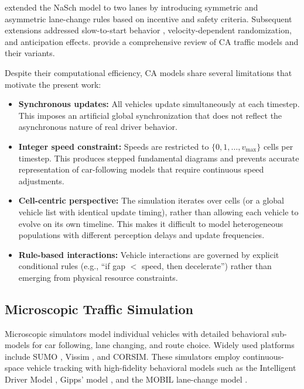 \documentclass[review,authoryear]{elsarticle}
\begin{document}
\citet{rickert1996two} extended the NaSch model to two lanes by introducing symmetric and asymmetric lane-change rules based on incentive and safety criteria. Subsequent extensions addressed slow-to-start behavior \citep{knospe2000towards}, velocity-dependent randomization, and anticipation effects. \citet{maerivoet2005cellular} provide a comprehensive review of CA traffic models and their variants.

Despite their computational efficiency, CA models share several limitations that motivate the present work:

\begin{itemize}
    \item \textbf{Synchronous updates:} All vehicles update simultaneously at each timestep. This imposes an artificial global synchronization that does not reflect the asynchronous nature of real driver behavior.

    \item \textbf{Integer speed constraint:} Speeds are restricted to $\{0, 1, \ldots, v_{\max}\}$ cells per timestep. This produces stepped fundamental diagrams and prevents accurate representation of car-following models that require continuous speed adjustments.

    \item \textbf{Cell-centric perspective:} The simulation iterates over cells (or a global vehicle list with identical update timing), rather than allowing each vehicle to evolve on its own timeline. This makes it difficult to model heterogeneous populations with different perception delays and update frequencies.

    \item \textbf{Rule-based interactions:} Vehicle interactions are governed by explicit conditional rules (e.g., ``if gap $<$ speed, then decelerate'') rather than emerging from physical resource constraints.
\end{itemize}

\subsection{Microscopic Traffic Simulation}
\label{sec:lit_microsim}

Microscopic simulators model individual vehicles with detailed behavioral sub-models for car following, lane changing, and route choice. Widely used platforms include SUMO \citep{lopez2018microscopic}, Vissim \citep{fellendorf2010microscopic}, and CORSIM. These simulators employ continuous-space vehicle tracking with high-fidelity behavioral models such as the Intelligent Driver Model \citep[IDM;][]{treiber2000congested}, Gipps' model \citep{gipps1981behavioural}, and the MOBIL lane-change model \citep{kesting2007general}.
\end{document}

